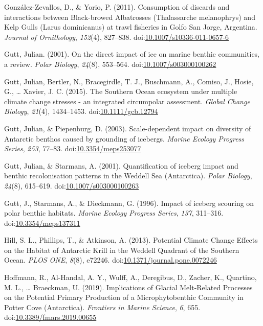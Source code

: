 \documentclass[
]{article}
\newlength{\cslhangindent}
\newenvironment{CSLReferences}[2] %
 {\begin{list}{}{%
  \setlength{\itemindent}{0pt}
  \setlength{\leftmargin}{0pt}
  \setlength{\parsep}{0pt}
  \ifodd #1
   \setlength{\leftmargin}{\cslhangindent}
   \setlength{\itemindent}{-1\cslhangindent}
  \fi
  \setlength{\itemsep}{#2\baselineskip}}}
 {\end{list}}
\begin{document}
\begin{CSLReferences}{1}{0}
González-Zevallos, D., \& Yorio, P. (2011). Consumption of discards and
interactions between {Black-browed Albatrosses} ({Thalassarche}
melanophrys) and {Kelp Gulls} ({Larus} dominicanus) at trawl fisheries
in {Golfo San Jorge}, {Argentina}. \emph{Journal of Ornithology},
\emph{152}(4), 827--838.
doi:\href{https://doi.org/10.1007/s10336-011-0657-6}{10.1007/s10336-011-0657-6}

Gutt, Julian. (2001). On the direct impact of ice on marine benthic
communities, a review. \emph{Polar Biology}, \emph{24}(8), 553--564.
doi:\href{https://doi.org/10.1007/s003000100262}{10.1007/s003000100262}

Gutt, Julian, Bertler, N., Bracegirdle, T. J., Buschmann, A., Comiso,
J., Hosie, G., \ldots{} Xavier, J. C. (2015). The {Southern Ocean}
ecosystem under multiple climate change stresses - an integrated
circumpolar assessment. \emph{Global Change Biology}, \emph{21}(4),
1434--1453.
doi:\href{https://doi.org/10.1111/gcb.12794}{10.1111/gcb.12794}

Gutt, Julian, \& Piepenburg, D. (2003). Scale-dependent impact on
diversity of {Antarctic} benthos caused by grounding of icebergs.
\emph{Marine Ecology Progress Series}, \emph{253}, 77--83.
doi:\href{https://doi.org/10.3354/meps253077}{10.3354/meps253077}

Gutt, Julian, \& Starmans, A. (2001). Quantification of iceberg impact
and benthic recolonisation patterns in the {Weddell Sea} ({Antarctica}).
\emph{Polar Biology}, \emph{24}(8), 615--619.
doi:\href{https://doi.org/10.1007/s003000100263}{10.1007/s003000100263}

Gutt, J., Starmans, A., \& Dieckmann, G. (1996). Impact of iceberg
scouring on polar benthic habitats. \emph{Marine Ecology Progress
Series}, \emph{137}, 311--316.
doi:\href{https://doi.org/10.3354/meps137311}{10.3354/meps137311}

Hill, S. L., Phillips, T., \& Atkinson, A. (2013). Potential {Climate
Change Effects} on the {Habitat} of {Antarctic Krill} in the {Weddell
Quadrant} of the {Southern Ocean}. \emph{PLOS ONE}, \emph{8}(8), e72246.
doi:\href{https://doi.org/10.1371/journal.pone.0072246}{10.1371/journal.pone.0072246}

Hoffmann, R., Al-Handal, A. Y., Wulff, A., Deregibus, D., Zacher, K.,
Quartino, M. L., \ldots{} Braeckman, U. (2019). Implications of {Glacial
Melt-Related Processes} on the {Potential Primary Production} of a
{Microphytobenthic Community} in {Potter Cove} ({Antarctica}).
\emph{Frontiers in Marine Science}, \emph{6}, 655.
doi:\href{https://doi.org/10.3389/fmars.2019.00655}{10.3389/fmars.2019.00655}


\end{CSLReferences}
\end{document}
